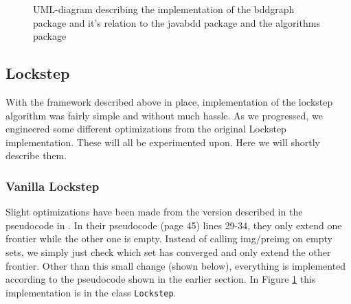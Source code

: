 \documentclass[../master/master.tex]{subfiles}
\begin{document}
\begin{figure}[H]
\begin{center}
\end{center}
\caption{UML-diagram describing the implementation of the bddgraph package and it's relation to the javabdd package and the algorithms package}
\label{main_uml}
\end{figure}

\subsection{Lockstep}
With the framework described above in place, implementation of the lockstep algorithm was fairly simple and without much hassle. As we progressed, we engineered some different optimizations from the original Lockstep implementation. These will all be experimented upon. Here we will shortly describe them.

\subsubsection{Vanilla Lockstep}
Slight optimizations have been made from the version described in the pseudocode in \cite{lockstep}. In their pseudocode (page 45) lines 29-34, they only extend one frontier while the other one is empty. Instead of calling img/preimg on empty sets, we simply just check which set has converged and only extend the other frontier.
Other than this small change (shown below), everything is implemented according to the pseudocode shown in the earlier section. In Figure \ref{main_uml} this implementation is in the class \texttt{Lockstep}.
\end{document}
